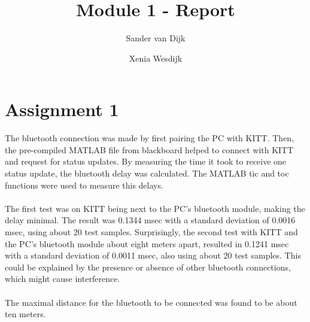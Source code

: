 \documentclass[final]{scrreprt} %
\title{Module 1 - Report}
\author{Sander {van Dijk} \and Xenia {Wesdijk}}
\begin{document}
\chapter{Assignment 1}
The bluetooth connection was made by first pairing the PC with KITT. Then, the pre-compiled MATLAB file from blackboard helped to connect with KITT and request for status updates. By measuring the time it took to receive one status update, the bluetooth delay was calculated. The MATLAB tic and toc functions were used to measure this delays.
\\ \\
The first test was on KITT being next to the PC's bluetooth module, making the delay minimal. The result was 0.1344 msec with a standard deviation of 0.0016 msec, using about 20 test samples. Surprisingly, the second test with KITT and the PC's bluetooth module about eight meters apart, resulted in 0.1241 msec with a standard deviation of 0.0011 msec, also using about 20 test samples. This could be explained by the presence or absence of other bluetooth connections, which might cause interference.
\\ \\
The maximal distance for the bluetooth to be connected was found to be about ten meters.
\end{document}
